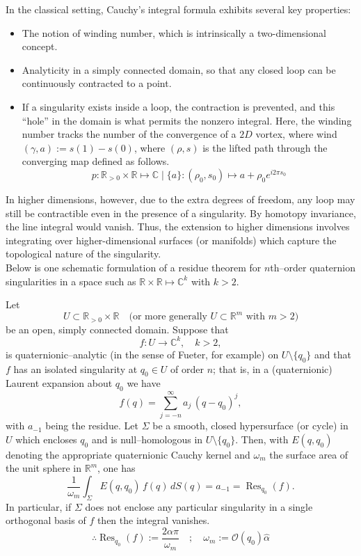 \documentclass[12pt]{article}
\begin{document}
In the classical setting, Cauchy's integral formula exhibits several key properties:
\begin{itemize}
    \item The notion of winding number, which is intrinsically a two-dimensional concept.
    \item Analyticity in a simply connected domain, so that any closed loop can be continuously contracted to a point.
    \item If a singularity exists inside a loop, the contraction is prevented, and this “hole” in the domain is what permits the nonzero integral. Here, the winding number tracks the number of the convergence of a $2D$ vortex, where wind$(\gamma, a) := s(1) - s(0)$, where $(\rho, s)$ is the lifted path through the converging map defined as follows. 
    \[
    p: \mathbb{R}_{>0} \times \mathbb{R} \mapsto \mathbb{C} \mid \{a\}: (\rho_{0}, s_{0}) \mapsto a + \rho_{0} e^{i 2\pi s_{0}} 
    \]
\end{itemize}
In higher dimensions, however, due to the extra degrees of freedom, any loop may still be contractible even in the presence of a singularity. By homotopy invariance, the line integral would vanish. Thus, the extension to higher dimensions involves integrating over higher-dimensional surfaces (or manifolds) which capture the topological nature of the singularity.\\ 

Below is one schematic formulation of a residue theorem for \(n\)th–order quaternion singularities in a space such as \(\mathbb{R}\times\mathbb{R} \mapsto \mathbb{C}^k\) with \(k>2\).

\begin{theorem}
  Let 
  \[
  U \subset \mathbb{R}_{>0}\times\mathbb{R} \quad \text{(or more generally } U\subset \mathbb{R}^m \text{ with } m>2\text{)}
  \]
  be an open, simply connected domain. Suppose that 
  \[
  f: U\to \mathbb{C}^k,\quad k>2,
  \]
  is quaternionic–analytic (in the sense of Fueter, for example) on \(U\setminus\{q_0\}\) and that \(f\) has an isolated singularity at \(q_0\in U\) of order \(n\); that is, in a (quaternionic) Laurent expansion about \(q_0\) we have
  \[
  f(q) = \sum_{j=-n}^{\infty} a_j\,(q-q_0)^j,
  \]
  with \(a_{-1}\) being the residue. Let \(\Sigma\) be a smooth, closed hypersurface (or cycle) in \(U\) which encloses \(q_0\) and is null–homologous in \(U\setminus\{q_0\}\). Then, with \(E(q,q_0)\) denoting the appropriate quaternionic Cauchy kernel and \(\omega_m\) the surface area of the unit sphere in \(\mathbb{R}^m\), one has
  \[
  \frac{1}{\omega_m} \int_{\Sigma} E(q,q_0)\, f(q) \, dS(q) = a_{-1} = \operatorname{Res}_{q_0}(f).
  \]
  In particular, if \(\Sigma\) does not enclose any particular singularity in a single orthogonal basis of \(f\) then the integral vanishes.
  \[
  \therefore \operatorname{Res}_{q_{0}} (f) := {\frac{2 \alpha \pi}{\omega_{m}}  \quad ; \quad \omega_{m}} := \mathcal{O}(q_{0}) \hat \alpha
  \]
\end{theorem}
\end{document}
